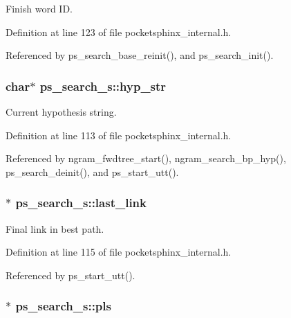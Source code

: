 Finish word I\-D. 



Definition at line 123 of file pocketsphinx\-\_\-internal.\-h.



Referenced by ps\-\_\-search\-\_\-base\-\_\-reinit(), and ps\-\_\-search\-\_\-init().

\subsubsection[{hyp\-\_\-str}]{\setlength{\rightskip}{0pt plus 5cm}char$\ast$ ps\-\_\-search\-\_\-s\-::hyp\-\_\-str}\label{structps__search__s_aa398c736a887af97e42b2a562359adc3}


Current hypothesis string. 



Definition at line 113 of file pocketsphinx\-\_\-internal.\-h.



Referenced by ngram\-\_\-fwdtree\-\_\-start(), ngram\-\_\-search\-\_\-bp\-\_\-hyp(), ps\-\_\-search\-\_\-deinit(), and ps\-\_\-start\-\_\-utt().

\subsubsection[{last\-\_\-link}]{$\ast$ ps\-\_\-search\-\_\-s\-::last\-\_\-link}\label{structps__search__s_aa3020ef7bd4e56713dfe2fbad52e6e4f}


Final link in best path. 



Definition at line 115 of file pocketsphinx\-\_\-internal.\-h.



Referenced by ps\-\_\-start\-\_\-utt().

\subsubsection[{pls}]{$\ast$ ps\-\_\-search\-\_\-s\-::pls}\label{structps__search__s_a2a33b7698fb237b42e007788f65cd46c}


